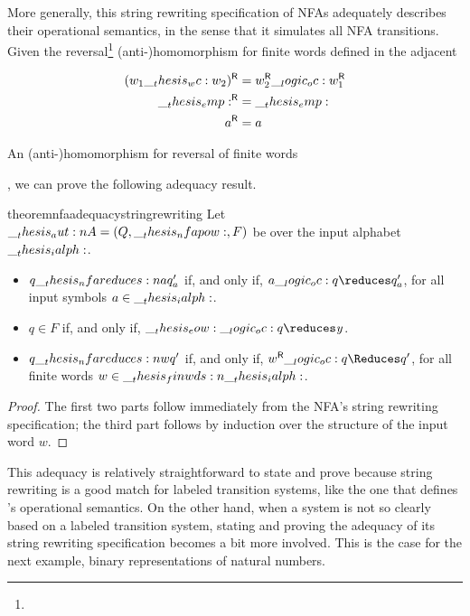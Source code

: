 More generally, this string rewriting specification of \acp{NFA} adequately describes their operational semantics, in the sense that it simulates all \ac{NFA} transitions.
Given the reversal\footnote[][2.5\baselineskip]{} (anti-)\-homo\-morph\-ism for finite words defined in the adjacent %
\begin{marginfigure}[-28
\baselineskip]
  \begin{align*}
    \rev*{w_1 \wc w_2} &= \rev{w_2} \oc \rev{w_1} \\
    \rev{\emp} &= \emp \\
    \rev{a} &= a
  \end{align*}
  \caption{An (anti-)\-homo\-morph\-ism for reversal of finite words}\label{fig:string-rewriting:reversal}
\end{marginfigure}%
, we can prove the following adequacy result.
\begin{restatable}[
  name=Adequacy of \ac*{NFA} specification,
  label=thm:nfa-adequacy-string-rewriting
]{theorem}{nfaadequacystringrewriting}
  Let $\__thesis_aut:n {A} = (Q, \__thesis_nfapow:, F)$ be  over the input alphabet $\__thesis_ialph:$.
  \begin{itemize}[nosep]
  \item
    $q \nfareduces[a] q'_a$ if, and only if, $a \oc q \reduces q'_a$, for all input symbols $a \in \__thesis_ialph:$.
  \item
    $q \in F$ if, and only if, $\eow \oc q \reduces \symacc$.%
  \item
    $q \nfareduces[w] q'$ if, and only if, $\rev{w} \oc q \Reduces q'$, for all finite words $w \in \__thesis_finwds:n {\__thesis_ialph:}$.
  \end{itemize}  
\end{restatable}
\begin{proof}
  The first two parts follow immediately from the \ac{NFA}'s string rewriting specification; the third part follows by induction over the structure of the input word $w$.
\end{proof}

This adequacy  is relatively straightforward to state and prove because string rewriting is a good match for labeled transition systems, like the one that defines 's operational semantics.
On the other hand, when a system is not so clearly based on a labeled transition system, stating and proving the adequacy of its string rewriting specification becomes a bit more involved.
This is the case for the next example, binary representations of natural numbers.

